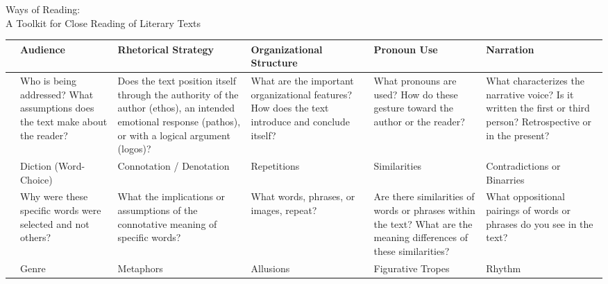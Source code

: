 \documentclass[12pt]{article}
\begin{document}
\setlength{\tabcolsep}{8pt}

\setlength{\arrayrulewidth}{.75mm}

\begin{center}
\Large{Ways of Reading: \\
A Toolkit for Close Reading of Literary Texts}
\end{center}

\begin{table}[ht]
\centering

\begin{tabular}{| m{2mm} *{5}{|m{1.75in}} |}
\hline
{}
& 
Audience & 
Rhetorical Strategy & 
Organizational \newline Structure & 
Pronoun Use & 
Narration \\ \hline
\centering\parbox[t]{2mm}{} &

Who is being addressed? What assumptions does the text make about the reader? &
Does the text position itself through the authority of the author (ethos), an intended emotional response (pathos), or with a logical argument (logos)? \newline &
What are the important organizational features? How does the text introduce and conclude itself? &
What pronouns are used? How do these gesture toward the author or the reader? &
What characterizes the narrative voice? Is it written the first or third
person? Retrospective or in the present? \\ 

\hline 
{}
&
Diction (Word-Choice) &
Connotation \newline / Denotation &
Repetitions &
Similarities &
Contradictions \newline or Binarries \\ 
\hline

\centering\parbox[t]{2mm}{} &

Why were these specific words were selected and not others? &
What the implications or assumptions of the connotative meaning of specific words? &
What words, phrases, or images, repeat? &
Are there similarities of words or phrases within the text? What are the
meaning differences of these similarities? \newline &
What oppositional pairings of words or phrases do you see in the text? \\ 
\hline

& 
Genre &
Metaphors &
Allusions &
Figurative Tropes &
Rhythm \\ \hline


\end{tabular}
\end{table}
\end{document}
